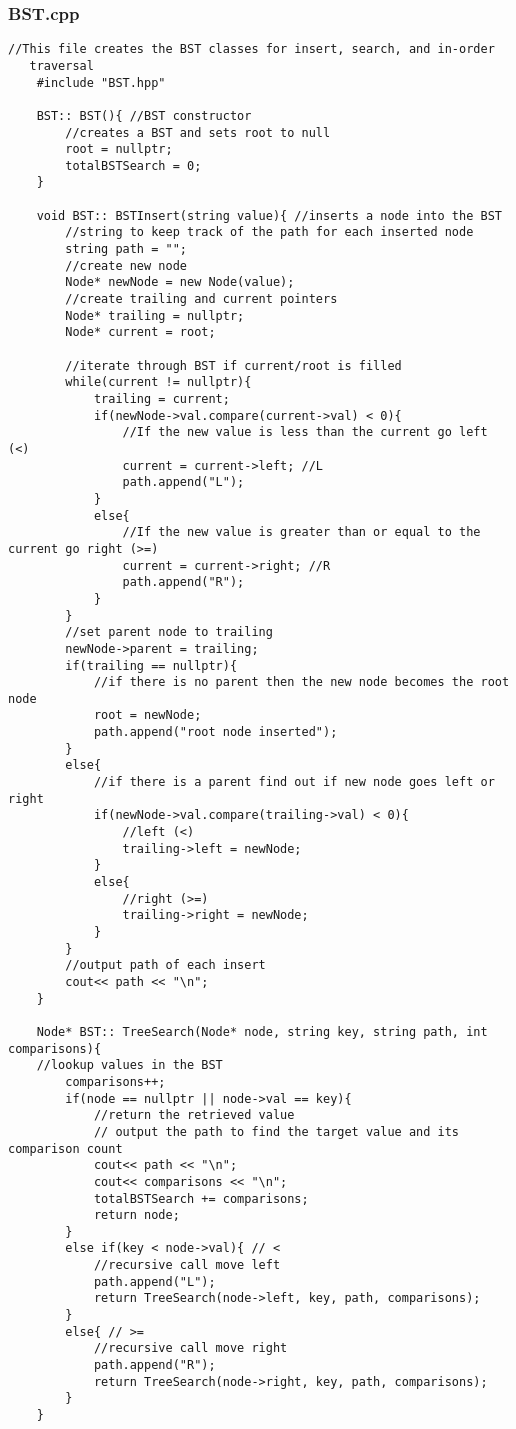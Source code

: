\documentclass[letterpaper, 10pt,DIV=13]{scrartcl}
\numberwithin{equation}{section} %
\numberwithin{figure}{section} %
\numberwithin{table}{section} %
\begin{document}
\subsubsection*{BST.cpp}
    \lstset{numbers=left, numberstyle=\tiny, stepnumber=1, numbersep=5pt, basicstyle=\footnotesize\ttfamily}
    \begin{lstlisting}[frame=single, ]
   //This file creates the BST classes for insert, search, and in-order
   traversal
    #include "BST.hpp"
    
    BST:: BST(){ //BST constructor
        //creates a BST and sets root to null
        root = nullptr;
        totalBSTSearch = 0;
    } 
    
    void BST:: BSTInsert(string value){ //inserts a node into the BST
        //string to keep track of the path for each inserted node
        string path = "";
        //create new node
        Node* newNode = new Node(value);
        //create trailing and current pointers
        Node* trailing = nullptr;
        Node* current = root;
    
        //iterate through BST if current/root is filled
        while(current != nullptr){
            trailing = current;
            if(newNode->val.compare(current->val) < 0){
                //If the new value is less than the current go left (<)
                current = current->left; //L
                path.append("L");
            }
            else{
                //If the new value is greater than or equal to the current go right (>=)
                current = current->right; //R
                path.append("R");
            }
        }
        //set parent node to trailing
        newNode->parent = trailing;
        if(trailing == nullptr){
            //if there is no parent then the new node becomes the root node
            root = newNode;
            path.append("root node inserted");
        }
        else{
            //if there is a parent find out if new node goes left or right
            if(newNode->val.compare(trailing->val) < 0){
                //left (<)
                trailing->left = newNode;
            }
            else{
                //right (>=)
                trailing->right = newNode;
            }
        }
        //output path of each insert
        cout<< path << "\n";
    }
    
    Node* BST:: TreeSearch(Node* node, string key, string path, int comparisons){ 
    //lookup values in the BST
        comparisons++;
        if(node == nullptr || node->val == key){
            //return the retrieved value
            // output the path to find the target value and its comparison count
            cout<< path << "\n";
            cout<< comparisons << "\n";
            totalBSTSearch += comparisons;
            return node;
        }
        else if(key < node->val){ // <
            //recursive call move left
            path.append("L");
            return TreeSearch(node->left, key, path, comparisons);
        }
        else{ // >=
            //recursive call move right
            path.append("R");
            return TreeSearch(node->right, key, path, comparisons);
        }
    }
    

\end{lstlisting}
\end{document}
